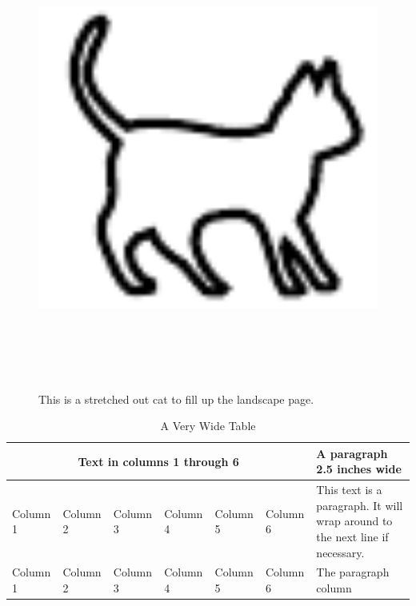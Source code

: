 \documentclass[11pt]{article}
\begin{document}
\begin{figure}
\centering
\includegraphics[height=6in]{cat}
\caption{This is a stretched out cat to fill up the landscape page.}
\end{figure}
 
\begin{table}
\caption{A Very Wide Table}  
\bigskip
\centering  
  \begin{tabular}{|l|l|l|l|l|l|p{2.5in}|}  
  \hline  
  \multicolumn{6}{|c|}{Text in columns 1 through 6}   
        & A paragraph 2.5 inches wide \\  
  \hline  
  Column 1 & Column 2 & Column 3 & Column 4 & Column 5 & Column 6
                      & This text is a paragraph.  It will wrap  
                      around to the next line if necessary. \\  
  Column 1 & Column 2 & Column 3 & Column 4 & Column 5 & Column 6
                      & The paragraph column \\  
  \hline  
  \end{tabular}  
\end{table}
\end{document}
